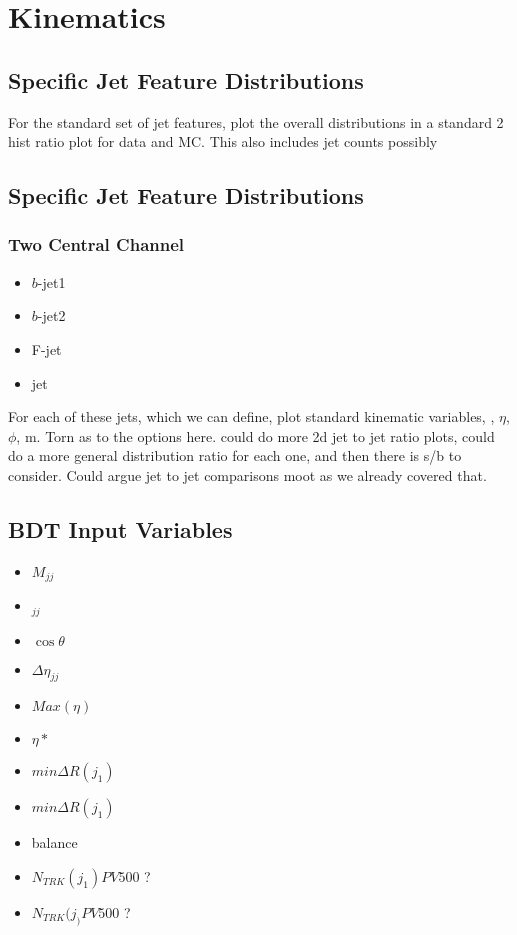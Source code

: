 \chapter{Kinematics}\label{c:K}

\section{Specific Jet Feature Distributions}

	For the standard set of jet features, plot the overall distributions in a standard 2 hist ratio plot for data and MC. This also includes jet counts possibly


\section{Specific Jet Feature Distributions}

	\subsection{Two Central Channel}
	
		\begin{itemize}
			\item $b$-jet1
			\item $b$-jet2
			\item F-jet
			\item jet
		\end{itemize}
		
		For each of these jets, which we can define, plot standard kinematic variables, \pt, $\eta$, $\phi$, m. Torn as to the options here. could do more 2d jet to jet ratio plots, could do a more general distribution ratio for each one, and then there is s/b to consider. Could argue jet to jet comparisons moot as we already covered that.

\section{BDT Input Variables}

	\begin{itemize}
		\item $M_{jj}$
		\item \pt$_{jj}$
		\item $\cos \theta$
		\item $\Delta\eta_{jj}$
		\item $Max(\eta)$
		\item $\eta*$
		\item $min\Delta R(j_1)$
		\item $min\Delta R(j_1)$
		\item \pt balance
		\item $N_{TRK}(j_1) PV500$ ?
		\item $N_{TRK}(j_) PV500$ ?
	\end{itemize}
	
